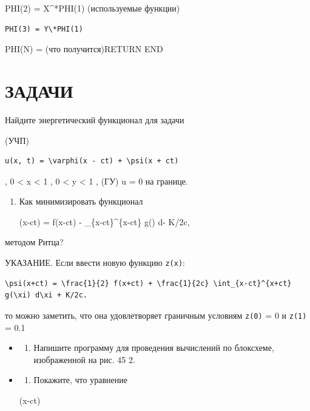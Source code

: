\documentclass[
  ukrainian,
]{article}
\providecommand{\tightlist}{%
  \setlength{\itemsep}{0pt}\setlength{\parskip}{0pt}}
\begin{document}
PHI(2) = X\^{}*PHI(1) (используемые функции)

\begin{verbatim}
PHI(3) = Y\*PHI(1)
\end{verbatim}

PHI(N) = (что получится)RETURN END

\section{\texorpdfstring{\textbf{ЗА}ДАЧИ}{ЗАДАЧИ}}\label{ux437ux430ux434ux430ux447ux438-7}

Найдите энергетический функционал для задачи

(УЧП)

\begin{verbatim}
u(x, t) = \varphi(x - ct) + \psi(x + ct)
\end{verbatim}

, 0 \textless{} x \textless{} 1 , 0 \textless{} y \textless{} 1 , (ГУ) u
= 0 на границе.

\begin{enumerate}
\def\labelenumi{\arabic{enumi}.}
\setcounter{enumi}{1}
\item
  Как минимизировать функционал

  \varphi(x-ct) =  f(x-ct) - 
  \int\_\{x-ct\}\^{}\{x-ct\} g(\xi) d\xi - K/2c,
\end{enumerate}

методом Ритца?

УКАЗАНИЕ. Если ввести новую функцию \texttt{z(x)}:

\begin{verbatim}
\psi(x+ct) = \frac{1}{2} f(x+ct) + \frac{1}{2c} \int_{x-ct}^{x+ct} g(\xi) d\xi + K/2c.
\end{verbatim}

то можно заметить, что она удовлетворяет граничным условиям
\texttt{z(0)} = 0 и \texttt{z(1)} = 0.1

\begin{itemize}
\item
  \begin{enumerate}
  \def\labelenumi{\arabic{enumi}.}
  \setcounter{enumi}{2}
  \tightlist
  \item
    Напишите программу для проведения вычислений по блоксхеме,
    изображенной на рис. 45 2.
  \end{enumerate}
\item
  \begin{enumerate}
  \def\labelenumi{\arabic{enumi}.}
  \setcounter{enumi}{3}
  \tightlist
  \item
    Покажите, что уравнение
  \end{enumerate}

  \phi(x-ct)
\end{itemize}
\end{document}
